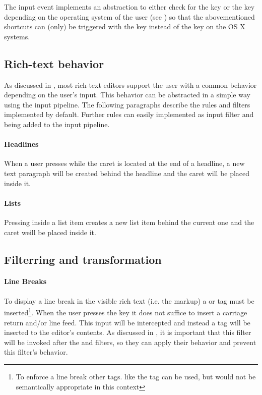 The input event implements an abstraction to either check for the  key or the  key depending on the operating system of the user (see ) so that the abovementioned shortcuts can (only) be triggered with the  key instead of the  key on the OS X systems.


\subsection{Rich-text behavior}

As discussed in , most rich-text editors support the user with a common behavior depending on the user's input. This behavior can be abstracted in a simple way using the input pipeline. The following paragraphs describe the rules and filters implemented by default. Further rules can easily implemented as input filter and being added to the input pipeline.

\paragraph{Headlines} When a user presses  while the caret is located at the end of a headline, a new text paragraph will be created behind the headline and the caret will be placed inside it.

\paragraph{Lists} Pressing  inside a list item creates a new list item behind the current one and the caret weill be placed inside it.

\subsection{Filterring and transformation}

\paragraph{Line Breaks} To display a line break in the visible rich text (i.e. the markup) a  or  tag must be inserted\footnote{To enforce a line break other tags. like the  tag can be used, but would not be semantically appropriate in this context}. When the user presses the  key it does not suffice to insert a carriage return and/or line feed. This input will be intercepted and instead a  tag will be inserted to the editor's contents. As discussed in , it is important that this filter will be invoked after the  and  filters, so they can apply their behavior and prevent this filter's behavior.


